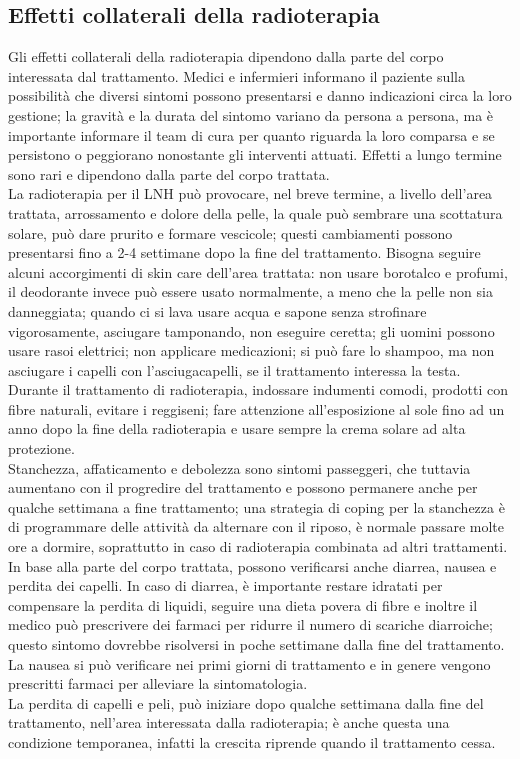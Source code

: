 \subsection{Effetti collaterali della radioterapia}
Gli effetti collaterali della radioterapia dipendono dalla parte del corpo interessata dal trattamento. 
Medici e infermieri informano il paziente sulla possibilità che diversi sintomi possono presentarsi e danno indicazioni
circa la loro gestione; la gravità e la durata del sintomo variano da persona a persona, ma è importante informare 
il team di cura per quanto riguarda la loro comparsa e se persistono o peggiorano nonostante gli interventi attuati. 
Effetti a lungo termine sono rari e dipendono dalla parte del corpo trattata\cite{MACMILLAN}.\\

La radioterapia per il LNH può provocare, nel breve termine, a livello dell’area 
trattata, arrossamento e dolore della pelle, la quale può sembrare una scottatura solare, può dare prurito e 
formare vescicole; questi cambiamenti possono presentarsi fino a 2-4 settimane dopo la fine del trattamento. 
Bisogna seguire alcuni accorgimenti di skin care dell’area trattata: 
non usare borotalco e profumi, il deodorante invece può essere usato normalmente, a meno che 
la pelle non sia danneggiata; quando ci si lava usare acqua e sapone senza strofinare vigorosamente, 
asciugare tamponando, non eseguire ceretta; gli uomini possono usare rasoi elettrici; non applicare medicazioni; 
si può fare lo shampoo, ma non asciugare i capelli con l’asciugacapelli, se il trattamento interessa la testa.\\ 
Durante il trattamento di radioterapia, indossare indumenti comodi, prodotti con fibre naturali, evitare i reggiseni; 
fare attenzione all’esposizione al sole fino ad un anno dopo la fine della radioterapia e usare sempre la crema 
solare ad alta protezione\cite{UKRADIOTP}.\\

Stanchezza, affaticamento e debolezza sono sintomi passeggeri, che tuttavia aumentano con il progredire del 
trattamento e possono permanere anche per qualche settimana a fine trattamento; 
una strategia di coping per la stanchezza è di programmare delle attività da alternare con il riposo, 
è normale passare molte ore a dormire, soprattutto in caso di radioterapia combinata 
ad altri trattamenti\cite{UKRADIOTP}.\\ 
In base alla parte del corpo trattata, possono verificarsi anche diarrea, nausea e perdita dei capelli. In caso di 
diarrea, è importante restare idratati per compensare la perdita di liquidi, seguire una dieta povera di fibre e 
inoltre il medico può prescrivere dei farmaci per ridurre il numero di scariche diarroiche; questo sintomo dovrebbe 
risolversi in poche settimane dalla fine del trattamento\cite{UKRADIOTP}. La nausea si può 
verificare nei primi giorni di trattamento e in genere vengono prescritti farmaci per alleviare 
la sintomatologia.\\ 
La perdita di capelli e peli, può iniziare dopo qualche settimana dalla fine del trattamento, nell’area 
interessata dalla radioterapia; è anche questa una condizione temporanea, infatti la crescita riprende quando il 
trattamento cessa\cite{UKRADIOTP}.

